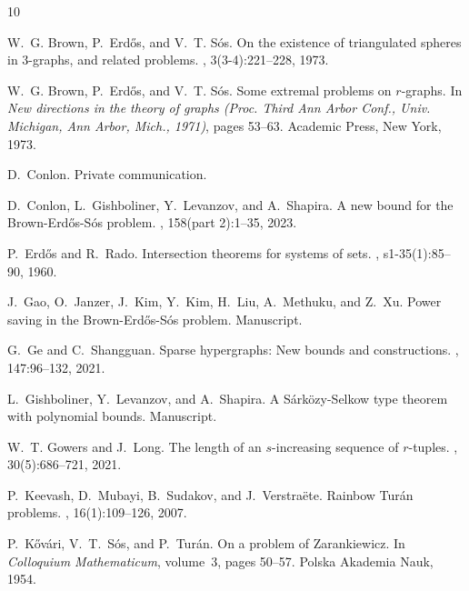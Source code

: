 \documentclass{daj}
\theoremstyle{plain}
\theoremstyle{remark}
\begin{document}

% 
\begin{thebibliography}{10}

W.~G. Brown, P.~Erd\H{o}s, and V.~T. S\'{o}s.
\newblock On the existence of triangulated spheres in {$3$}-graphs, and related
  problems.
, 3(3-4):221--228, 1973.

W.~G. Brown, P.~Erd\H{o}s, and V.~T. S\'{o}s.
\newblock Some extremal problems on {$r$}-graphs.
\newblock In {\em New directions in the theory of graphs ({P}roc. {T}hird {A}nn
  {A}rbor {C}onf., {U}niv. {M}ichigan, {A}nn {A}rbor, {M}ich., 1971)}, pages
  53--63. Academic Press, New York, 1973.

D.~Conlon.
\newblock Private communication.

D.~Conlon, L.~Gishboliner, Y.~Levanzov, and A.~Shapira.
\newblock A new bound for the {B}rown-{E}rd{\H{o}}s-{S}\'{o}s problem.
, 158(part 2):1--35, 2023.

P.~Erd{\H{o}}s and R.~Rado.
\newblock Intersection theorems for systems of sets.
, s1-35(1):85--90,
  1960.

J.~Gao, O.~Janzer, J.~Kim, Y.~Kim, H.~Liu, A.~Methuku, and Z.~Xu.
\newblock Power saving in the {Brown}-{Erd\H{o}s}-{S\'os} problem.
\newblock Manuscript.

G.~Ge and C.~Shangguan.
\newblock Sparse hypergraphs: New bounds and constructions.
, 147:96--132, 2021.

L.~Gishboliner, Y.~Levanzov, and A.~Shapira.
\newblock A {S}\'ark\"ozy-{S}elkow type theorem with polynomial bounds.
\newblock Manuscript.

W.~T. Gowers and J.~Long.
\newblock The length of an {$s$}-increasing sequence of {$r$}-tuples.
, 30(5):686--721, 2021.

P.~Keevash, D.~Mubayi, B.~Sudakov, and J.~Verstra{\"e}te.
\newblock Rainbow {Tur{\'a}n} problems.
, 16(1):109--126, 2007.

P.~K{\H{o}}v{\'a}ri, V.~T.~S{\'o}s, and P.~Tur{\'a}n.
\newblock On a problem of {Z}arankiewicz.
\newblock In {\em Colloquium Mathematicum}, volume~3, pages 50--57. Polska
  Akademia Nauk, 1954.


\end{thebibliography}
\end{document}
